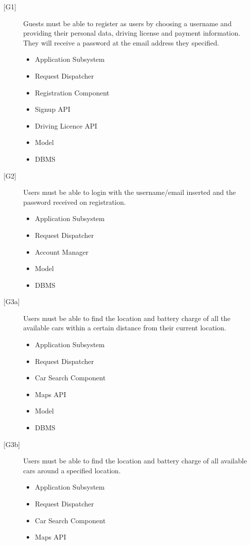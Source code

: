 \documentclass[english]{article}
\begin{document}
\begin{description}
	\item[{[G1]}]{Guests must be able to register as users by choosing a username and providing their personal data, driving license and payment information. They will receive a password at the email address they specified.}
	\begin{itemize}
		\item{Application Subsystem}
		\item{Request Dispatcher}
		\item{Registration Component}
		\item{Signup API}
		\item{Driving Licence API}
		\item{Model}
		\item{DBMS}
	\end{itemize}
	\item[{[G2]}]{Users must be able to login with the username/email inserted and the password received on registration.}
	\begin{itemize}
		\item{Application Subsystem}
		\item{Request Dispatcher}
		\item{Account Manager}
		\item{Model}
		\item{DBMS}
	\end{itemize}
	\item[{[G3a]}]{Users must be able to find the location and battery charge of all the available cars within a certain distance from their current location.}
	\begin{itemize}
		\item{Application Subsystem}
		\item{Request Dispatcher}
		\item{Car Search Component}
		\item{Maps API}
		\item{Model}
		\item{DBMS}
	\end{itemize}
	\item[{[G3b]}]{Users must be able to find the location and battery charge of all available cars around a specified location.}
	\begin{itemize}
		\item{Application Subsystem}
		\item{Request Dispatcher}
		\item{Car Search Component}
		\item{Maps API}

\end{itemize}
\end{description}
\end{document}
